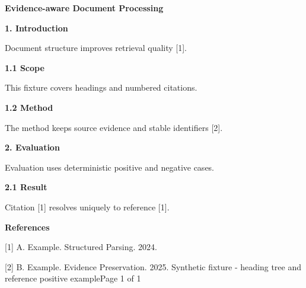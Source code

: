 \documentclass[11pt,a4paper]{article}
\begin{document}
{\fontsize{22}{27}\selectfont\bfseries Evidence-aware Document Processing}\par\vspace{7mm}
{\fontsize{16}{20}\selectfont\bfseries 1. Introduction}\par\vspace{3mm}
Document structure improves retrieval quality [1].\par\vspace{5mm}
{\fontsize{13}{17}\selectfont\bfseries 1.1 Scope}\par\vspace{3mm}
This fixture covers headings and numbered citations.\par\vspace{5mm}
{\fontsize{13}{17}\selectfont\bfseries 1.2 Method}\par\vspace{3mm}
The method keeps source evidence and stable identifiers [2].\par\vspace{6mm}
{\fontsize{16}{20}\selectfont\bfseries 2. Evaluation}\par\vspace{3mm}
Evaluation uses deterministic positive and negative cases.\par\vspace{5mm}
{\fontsize{13}{17}\selectfont\bfseries 2.1 Result}\par\vspace{3mm}
Citation [1] resolves uniquely to reference [1].\par\vspace{8mm}
{\fontsize{16}{20}\selectfont\bfseries References}\par\vspace{3mm}
[1] A. Example. Structured Parsing. 2024.\par\vspace{3mm}
[2] B. Example. Evidence Preservation. 2025.
\vfill\scriptsize Synthetic fixture - heading tree and reference positive example\hfill Page 1 of 1
\end{document}
